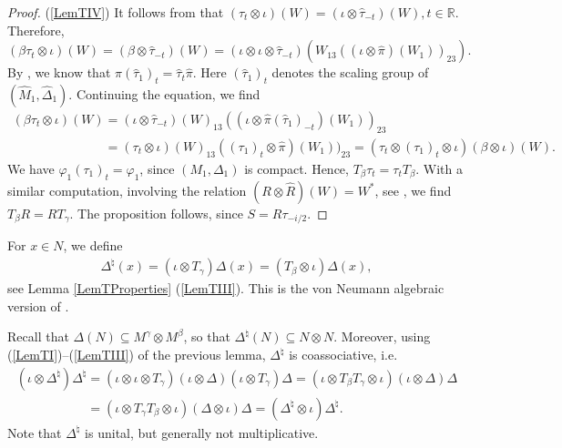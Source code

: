 \begin{proof}
(\ref{LemTIV})
It follows from \cite[Proposition 2.1, Corollary 2.2]{KusVaeII} that $(\tau_t \otimes \iota)(W) = (\iota \otimes \hat{\tau}_{-t})(W), t \in \mathbb{R}$. Therefore,
\[
(\beta \tau_t \otimes \iota)(W) = (\beta \otimes \hat{\tau}_{-t})(W) = (\iota \otimes \iota \otimes \hat{\tau}_{-t})(W_{13}((\iota \otimes \hat{\pi})(W_1))_{23}).
\]
By \cite[Proposition 5.45]{KusVae}, we know that $\hat{\pi}(\hat{\tau}_1)_t = \hat{\tau}_t \hat{\pi}$. Here $(\hat{\tau}_1)_t$ denotes the scaling group of $(\hat{M}_1, \hat{\Delta}_1)$. Continuing the equation, we f\/ind
\begin{gather*}
  (\beta \tau_t \otimes \iota)(W)  = (\iota \otimes \hat{\tau}_{-t})(W)_{13} ((\iota \otimes   \hat{\pi}(\hat{\tau}_1)_{-t})(W_1))_{23} \\
\phantom{(\beta \tau_t \otimes \iota)(W)}{}
=  (\tau_t \otimes \iota)(W)_{13} ((\tau_1)_{t}\otimes \hat{\pi})(W_1))_{23} =
(\tau_t \otimes (\tau_1)_{t} \otimes \iota) (\beta \otimes \iota)(W).
\end{gather*}
We have $\varphi_1 (\tau_1)_t =  \varphi_1$, since $(M_1, \Delta_1)$ is compact. Hence, $T_\beta \tau_t = \tau_t T_\beta$. With a similar computation, involving the relation $(R \otimes \hat{R})(W) = W^\ast$, see \cite[Proposition 2.1, Corollary 2.2]{KusVaeII}, we f\/ind $T_\beta R = R T_\gamma$. The proposition follows, since $S = R \tau_{-i/2}$.
\end{proof}

\begin{dfn}
For $x \in N$, we def\/ine
\begin{gather}\label{EqnShiftedCom}
\Delta^\natural(x) = (\iota \otimes T_\gamma) \Delta(x) = (T_\beta \otimes \iota) \Delta(x),
\end{gather}
 see Lemma \ref{LemTProperties} (\ref{LemTIII}). This is the von Neumann algebraic version of \cite[equation~(4)]{VaiHyp}.
\end{dfn}
  Recall that $\Delta(N) \subseteq M^\gamma \otimes M^\beta$, so that $\Delta^\natural(N) \subseteq N \otimes N$. Moreover, using (\ref{LemTI})--(\ref{LemTIII}) of the previous lemma, $\Delta^\natural$ is coassociative, i.e.
\begin{gather}
   (\iota \otimes \Delta^\natural) \Delta^\natural  = (\iota \otimes \iota \otimes T_\gamma)(\iota \otimes \Delta)(\iota \otimes T_\gamma)\Delta
 = (\iota \otimes T_\beta   T_\gamma \otimes \iota) (\iota \otimes \Delta) \Delta \nonumber\\
\phantom{(\iota \otimes \Delta^\natural) \Delta^\natural }{}
=   (\iota \otimes T_\gamma   T_\beta \otimes \iota) (\Delta \otimes \iota) \Delta
 =  ( \Delta^\natural \otimes \iota) \Delta^\natural.\label{EqnCoas}
\end{gather}
Note that $\Delta^\natural$ is unital, but generally not multiplicative.

